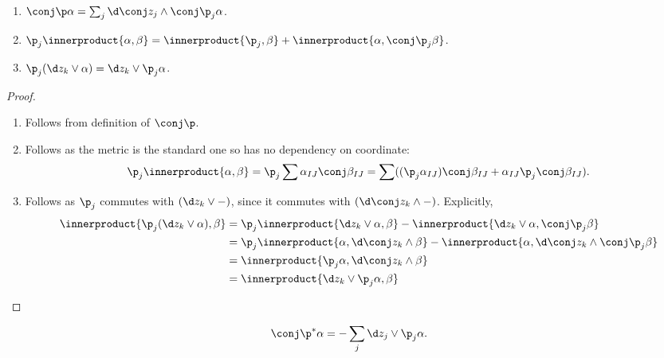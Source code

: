 \documentclass[a4paper]{article}
\newcommand{\w}{\wedge} %
\newcommand*{\ip}{\innerproduct}
\begin{document}
\begin{lemma}\leavevmode
  \begin{enumerate}
  \item \(\conj \p \alpha = \sum_j \d \conj z_j \w \conj \p_j \alpha\).
  \item \(\p_j \ip{\alpha, \beta} = \ip{\p_j, \beta} + \ip{\alpha, \conj \p_j \beta}\).
  \item \(\p_j (\d z_k \vee \alpha) = \d z_k \vee \p_j \alpha\).
  \end{enumerate}
\end{lemma}

\begin{proof}\leavevmode
  \begin{enumerate}
  \item Follows from definition of \(\conj \p\).
  \item Follows as the metric is the standard one so has no dependency on coordinate:
    \[
      \p_j \ip{\alpha, \beta}
      = \p_j \sum \alpha_{IJ} \conj \beta_{IJ}
      = \sum ((\p_j \alpha_{IJ}) \conj \beta_{IJ} + \alpha_{IJ} \p_j \conj \beta_{IJ}).
    \]
  \item Follows as \(\p_j\) commutes with \((\d z_k \vee -)\), since it commutes with \((\d \conj z_k \w -)\). Explicitly,
    \begin{align*}
      \ip{\p_j (\d z_k \vee \alpha), \beta}
      &= \p_j \ip{\d z_k \vee \alpha, \beta} - \ip{\d z_k \vee \alpha, \conj \p_j \beta} \\
      &= \p_j \ip{\alpha, \d \conj z_k \w \beta} - \ip{\alpha, \d \conj z_k \w \conj \p_j \beta} \\
      &= \ip{\p_j \alpha, \d \conj z_k \w \beta} \\
      &= \ip{\d z_k \vee \p_j \alpha, \beta}
    \end{align*}
  \end{enumerate}
\end{proof}

\begin{lemma}
  \[
    \conj \p^* \alpha = - \sum_j \d z_j \vee \p_j \alpha.
  \]
\end{lemma}
\end{document}
